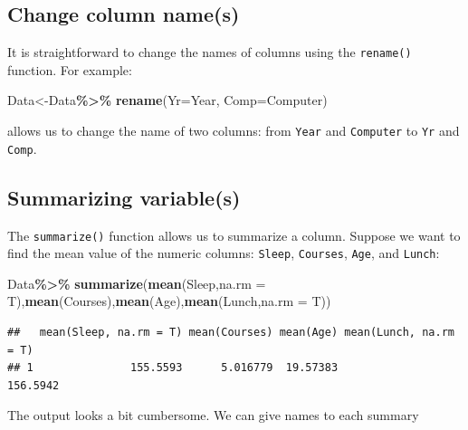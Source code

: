 \documentclass[
]{book}
\newenvironment{Shaded}{\begin{snugshade}}{\end{snugshade}}
\newcommand{\AttributeTok}[1]{\textcolor[rgb]{0.13,0.29,0.53}{#1}}
\newcommand{\FunctionTok}[1]{\textcolor[rgb]{0.13,0.29,0.53}{\textbf{#1}}}
\newcommand{\NormalTok}[1]{#1}
\newcommand{\OtherTok}[1]{\textcolor[rgb]{0.56,0.35,0.01}{#1}}
\newcommand{\SpecialCharTok}[1]{\textcolor[rgb]{0.81,0.36,0.00}{\textbf{#1}}}
\begin{document}
\hypertarget{change-column-names-1}{%
\subsection{Change column name(s)}\label{change-column-names-1}}

It is straightforward to change the names of columns using the \texttt{rename()} function. For example:

\begin{Shaded}
\begin{Highlighting}[]
\NormalTok{Data}\OtherTok{\textless{}{-}}\NormalTok{Data}\SpecialCharTok{\%\textgreater{}\%}
  \FunctionTok{rename}\NormalTok{(}\AttributeTok{Yr=}\NormalTok{Year, }\AttributeTok{Comp=}\NormalTok{Computer)}
\end{Highlighting}
\end{Shaded}

allows us to change the name of two columns: from \texttt{Year} and \texttt{Computer} to \texttt{Yr} and \texttt{Comp}.

\hypertarget{summarizing-variables-1}{%
\subsection{Summarizing variable(s)}\label{summarizing-variables-1}}

The \texttt{summarize()} function allows us to summarize a column. Suppose we want to find the mean value of the numeric columns: \texttt{Sleep}, \texttt{Courses}, \texttt{Age}, and \texttt{Lunch}:

\begin{Shaded}
\begin{Highlighting}[]
\NormalTok{Data}\SpecialCharTok{\%\textgreater{}\%}
  \FunctionTok{summarize}\NormalTok{(}\FunctionTok{mean}\NormalTok{(Sleep,}\AttributeTok{na.rm =}\NormalTok{ T),}\FunctionTok{mean}\NormalTok{(Courses),}\FunctionTok{mean}\NormalTok{(Age),}\FunctionTok{mean}\NormalTok{(Lunch,}\AttributeTok{na.rm =}\NormalTok{ T))}
\end{Highlighting}
\end{Shaded}

\begin{verbatim}
##   mean(Sleep, na.rm = T) mean(Courses) mean(Age) mean(Lunch, na.rm = T)
## 1               155.5593      5.016779  19.57383               156.5942
\end{verbatim}

The output looks a bit cumbersome. We can give names to each summary
\end{document}
